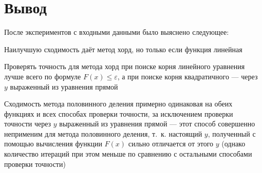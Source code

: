 \documentclass[a4paper]{article}
\begin{document}
\section{Вывод}
После экспериментов с входными данными было выяснено следующее:
{
\begin{list}{.}{}
\item Наилучшую сходимость даёт метод хорд, но только если функция линейная
\item Проверять точность для метода хорд при поиске корня линейного уравнения
лучше всего по формуле $F(x)\le\varepsilon$, а при поиске корня квадратичного ---
через $y$ выраженный из уравнения прямой
\item Сходимость метода половинного деления примерно одинаковая на обеих
функциях и всех способах проверки точности, за исключением проверки точности
через $y$ выраженный из уравнения прямой --- этот способ совершенно неприменим
для метода половинного деления, т.~к. настоящий $y$, полученный с помощью
вычисления функции $F(x)$ сильно отличается от этого $y$ (однако количество
итераций при этом меньше по сравнению с остальными способами проверки точности)
\end{list}
}
\end{document}
